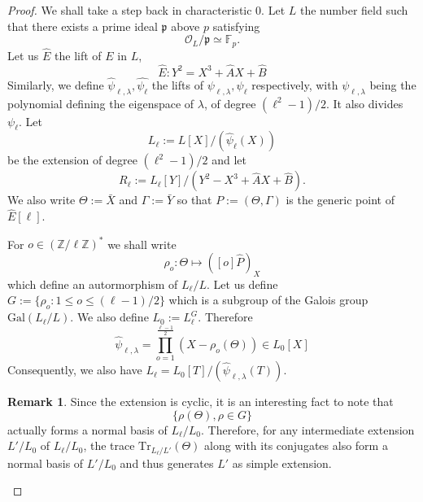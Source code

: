 \documentclass[12pt]{article}
\theoremstyle{plain}
\theoremstyle{definition}
\newtheorem*{remark}{Remark}
\def\Z{\ensuremath{\mathbb{Z}}}
\def\F{\ensuremath{\mathbb{F}}}
\begin{document}
\begin{proof}
We shall take a step back in characteristic $0$. Let $L$ the number field 
such that there exists a prime ideal $\mathfrak{p}$ above $p$ satisfying 
\begin{equation}
\mathcal{O}_L/\mathfrak{p} \simeq \F_p.
\end{equation}
Let us $\widehat{E}$ the lift of $E$ in $L$,
\[
\widehat{E} : Y^2 = X^3 + \widehat{A}X + \widehat{B}
\]
Similarly, we define $\widehat{\psi}_{\ell,\lambda}, \widehat{\psi_\ell}$ the 
lifts of $\psi_{\ell,\lambda}, \psi_\ell$ respectively, with 
$\psi_{\ell,\lambda}$ being the polynomial defining the eigenspace of $\lambda$, 
of degree $(\ell^2 - 1)/2$. It also divides $\psi_\ell$. Let 
\[
L_\ell:=L[X]/(\widehat{\psi}_\ell(X))
\]
be the extension of degree $(\ell^2-1)/2$ and let 
\[
R_\ell:=L_\ell[Y]/(Y^2-X^3+\widehat{A}X+\widehat{B}). 
\]
We also write $\Theta:=\bar{X}$ and $\Gamma:=\bar{Y}$ so that 
$P:=(\Theta,\Gamma)$ is the generic point of $\widehat{E}[\ell]$.

For $o\in(\Z/\ell\Z)^{\ast}$ we shall write
\begin{equation}
\rho_o : \Theta \mapsto ([o]\widehat{P})_X
\end{equation}
which define an autormorphism of $L_\ell/L$. Let us define 
$G:=\lbrace{\rho_o : 1 \leq o\leq (\ell-1)/2}\rbrace$ which is a subgroup of 
the Galois group $\text{Gal}(L_\ell/L)$. We also define $L_0 := L_\ell^G$. Therefore
\begin{equation}
\widehat{\psi}_{\ell,\lambda}=\prod_{o=1}^{\tfrac{\ell-1}{2}}{(X-\rho_o(\Theta))}\in
L_0[X]
\end{equation}
Consequently, we also have $L_\ell = L_0[T]/(\widehat{\psi}_{\ell,\lambda}(T))$.

\begin{remark}
Since the extension is cyclic, it is an interesting fact to note that
\[
\lbrace{\rho(\Theta), \rho\in G}\rbrace
\]
actually forms a normal basis of $L_\ell/L_0$. Therefore, for any intermediate 
extension $L'/L_0$ of $L_\ell/L_0$, the trace $\text{Tr}_{L_\ell/L'}(\Theta)$ 
along with its conjugates also form a normal basis of $L'/L_0$ and thus 
generates $L'$ as simple extension.
\end{remark}


\end{proof}
\end{document}
